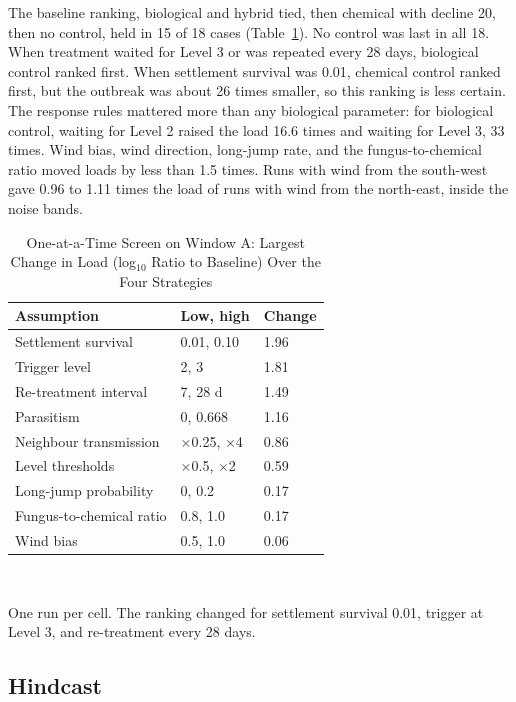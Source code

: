 \documentclass[conference]{IEEEtran}
\begin{document}
The baseline ranking, biological and hybrid tied, then chemical with decline 20, then no control, held in 15 of 18 cases (Table~\ref{tab:oat}). No control was last in all 18. When treatment waited for Level 3 or was repeated every 28 days, biological control ranked first. When settlement survival was 0.01, chemical control ranked first, but the outbreak was about 26 times smaller, so this ranking is less certain. The response rules mattered more than any biological parameter: for biological control, waiting for Level 2 raised the load 16.6 times and waiting for Level 3, 33 times. Wind bias, wind direction, long-jump rate, and the fungus-to-chemical ratio moved loads by less than 1.5 times. Runs with wind from the south-west gave 0.96 to 1.11 times the load of runs with wind from the north-east, inside the noise bands.

\begin{table}[t]
\caption{One-at-a-Time Screen on Window A: Largest Change in Load (log$_{10}$ Ratio to Baseline) Over the Four Strategies}
\label{tab:oat}
\centering
\footnotesize
\begin{tabular}{@{}lll@{}}
\toprule
Assumption & Low, high & Change \\
\midrule
Settlement survival & 0.01, 0.10 & 1.96 \\
Trigger level & 2, 3 & 1.81 \\
Re-treatment interval & 7, 28 d & 1.49 \\
Parasitism & 0, 0.668 & 1.16 \\
Neighbour transmission & $\times$0.25, $\times$4 & 0.86 \\
Level thresholds & $\times$0.5, $\times$2 & 0.59 \\
Long-jump probability & 0, 0.2 & 0.17 \\
Fungus-to-chemical ratio & 0.8, 1.0 & 0.17 \\
Wind bias & 0.5, 1.0 & 0.06 \\
\bottomrule
\end{tabular}
\\[2pt]
\parbox{\columnwidth}{\footnotesize One run per cell. The ranking changed for settlement survival 0.01, trigger at Level 3, and re-treatment every 28 days.}
\end{table}

\subsection{Hindcast}
\end{document}
